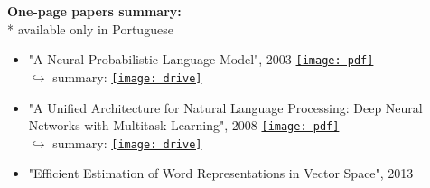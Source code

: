 \documentclass[
	a4paper,
]{fortysecondscv}
\begin{document}
\begin{minipage}[t]{0.53\linewidth}
\small
\textbf{\color{sectioncolor}One-page papers summary:}
\vspace{3.0mm}\\
\scriptsize
* available only in Portuguese

\newcommand{\drive}[1]{\href{#1}{\texttt{[image: drive]}}}
\newcommand{\pdf}[1]{\href{#1}{\hspace{1mm}\texttt{[image: pdf]}\\}}
\begin{itemize}[leftmargin=*,labelindent=3mm,labelsep=1mm]
    \item "A Neural Probabilistic Language Model", 2003
        \pdf{http://www.jmlr.org/papers/volume3/bengio03a/bengio03a.pdf}
        \hfill
        \hspace{2mm} $\hookrightarrow$ summary: 
            \hspace{0.1mm}
            \drive{https://docs.google.com/document/d/1MBboy05JIT-TyNyTxl-ppMgO-4PvaaaZrnW-M1L-0yI/edit?usp=sharing}
    \item "A Unified Architecture for Natural Language Processing: Deep Neural Networks with Multitask Learning", 2008
        \pdf{https://ronan.collobert.com/pub/matos/2008_nlp_icml.pdf}
        \hfill
        \hspace{2mm} $\hookrightarrow$ summary: 
            \hspace{0.1mm}
        \drive{https://docs.google.com/document/d/1jd6sd-SxfUYHUdh8hbLCDcR_PZ11d51tiEEHWcL3-zE/edit?usp=sharing} 
    \item "Efficient Estimation of Word Representations in Vector Space", 2013

\end{itemize}
\end{minipage}
\end{document}
